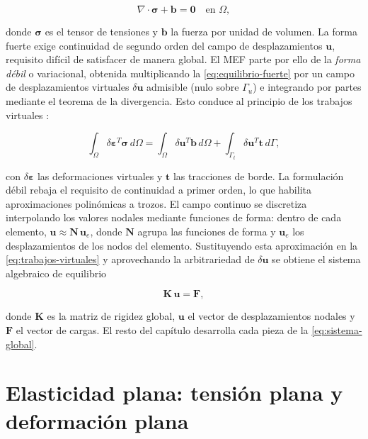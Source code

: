 \begin{equation}
\nabla \cdot \bm{\sigma} + \bm{b} = \bm{0} \quad \text{en } \Omega,
\label{eq:equilibrio-fuerte}
\end{equation}

donde $\bm{\sigma}$ es el tensor de tensiones y $\bm{b}$ la fuerza por unidad de volumen. La forma fuerte exige continuidad de segundo orden del campo de desplazamientos $\bm{u}$, requisito difícil de satisfacer de manera global. El MEF parte por ello de la \emph{forma débil} o variacional, obtenida multiplicando la \autoref{eq:equilibrio-fuerte} por un campo de desplazamientos virtuales $\delta\bm{u}$ admisible (nulo sobre $\Gamma_u$) e integrando por partes mediante el teorema de la divergencia. Esto conduce al principio de los trabajos virtuales \autocite{zienkiewicz2013fem,hughes2000fem,reddy2006introduction}:

\begin{equation}
\int_\Omega \delta\bm{\varepsilon}^{T} \bm{\sigma} \, d\Omega
= \int_\Omega \delta\bm{u}^{T} \bm{b} \, d\Omega
+ \int_{\Gamma_t} \delta\bm{u}^{T} \bm{t} \, d\Gamma,
\label{eq:trabajos-virtuales}
\end{equation}

con $\delta\bm{\varepsilon}$ las deformaciones virtuales y $\bm{t}$ las tracciones de borde. La formulación débil rebaja el requisito de continuidad a primer orden, lo que habilita aproximaciones polinómicas a trozos. El campo continuo se discretiza interpolando los valores nodales mediante funciones de forma: dentro de cada elemento, $\bm{u} \approx \bm{N}\,\bm{u}_e$, donde $\bm{N}$ agrupa las funciones de forma y $\bm{u}_e$ los desplazamientos de los nodos del elemento. Sustituyendo esta aproximación en la \autoref{eq:trabajos-virtuales} y aprovechando la arbitrariedad de $\delta\bm{u}$ se obtiene el sistema algebraico de equilibrio

\begin{equation}
\bm{K}\,\bm{u} = \bm{F},
\label{eq:sistema-global}
\end{equation}

donde $\bm{K}$ es la matriz de rigidez global, $\bm{u}$ el vector de desplazamientos nodales y $\bm{F}$ el vector de cargas. El resto del capítulo desarrolla cada pieza de la \autoref{eq:sistema-global}.

\section{Elasticidad plana: tensión plana y deformación plana}
\label{sec:elasticidad-plana}

